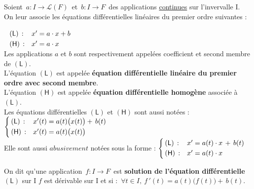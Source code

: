 Soient \(\, a:I\to \mathscr{L}(F)\, \) et \(\, b:I\to F\,\) des applications \underline{continues} sur l'invervalle I.\vspace{-0.3cm} \\
On leur associe les équations différentielles linéaires du premier ordre suivantes :\(\; \begin{array}{ll}
    & \\
    (\mathsf{L})\, : & x'=a\cdot x+b\vspace{0.1cm} \\
    (\mathsf{H})\,: & x'=a\cdot x
\end{array}\)\vspace{0.4cm} \\
Les applications $a$ et $b$ sont respectivement appelées coefficient et second membre de \((\mathsf{L})\).\vspace{0.1cm}\\
L'équation $(\mathsf{L})$ est appelée \textbf{équation différentielle linéaire du premier ordre avec second membre}.\vspace{0.1cm}\\
L'équation $(\mathsf{H})$ est appelée \textbf{équation différentielle homogène} associée à $(\mathsf{L})$.\vspace{0.4cm}\\
Les équations différentielles $(\mathsf{L})$ et $(\mathsf{H})$ sont aussi notées : \(
\left\{\!\!\begin{array}{ll}
    (\mathsf{L})\,: & x'(t)=a(t)\bigl(x(t)\bigr)+\,b(t)\vspace{0.1cm}\\
    (\mathsf{H})\,: & x'(t)=a(t)\bigl(x(t)\bigr)
\end{array}\right.\)\vspace{0.5cm}\\
Elle sont aussi $abusivement$ notées sous la forme : \(
    \left\{\!\!\begin{array}{ll}
        (\mathsf{L})\,: & x'=a(t)\cdot x\,+\,b(t)\vspace{0.1cm}\\
        (\mathsf{H})\,: & x'=a(t)\cdot x
    \end{array}\right.\)

\vspace{1.2cm}

On dit qu'une application \(\,f:I\to F\,\) est \textbf{solution de l'équation différentielle} $(\mathsf{L})$ sur I \ssi $f$ est dérivable sur I et si : \(\, \forall t\in I,\ f\,'(t)=a(t)\bigl(f(t)\bigr)+\,b(t).\)

